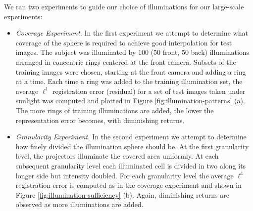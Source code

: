 We ran two experiments to guide our choice of illuminations for our large-scale experiments:\vspace{0mm}  
\begin{itemize}
\item {\em Coverage Experiment.} In the first experiment we attempt to determine what coverage of the sphere is required to achieve good interpolation for test images.  The subject was illuminated by 100 (50 front, 50 back) illuminations arranged in concentric rings centered at the front camera.  Subsets of the training images were chosen, starting at the front camera and adding a ring at a time.  Each time a ring was added to the training illumination set, the average $\ell^1$ registration error (residual) for a set of test images taken under sunlight was computed and plotted in Figure \ref{fig:illumination-patterns} (a).  The more rings of training illuminations are added, the lower the representation error becomes, with diminishing returns.\vspace{0mm}
\item {\em Granularity Experiment.} In the second experiment we attempt to determine how finely divided the illumination sphere should be.  At the first granularity level, the projectors  illuminate the covered area uniformly.  At each subsequent granularity level each illuminated cell is divided in two along its longer side but intensity doubled.  For each granularity level the average $\ell^1$ registration error is computed as in the coverage experiment and shown in Figure \ref{fig:illumination-sufficiency} (b).  Again, diminishing returns are observed as more illuminations are added.\vspace{0mm}  
\end{itemize}
